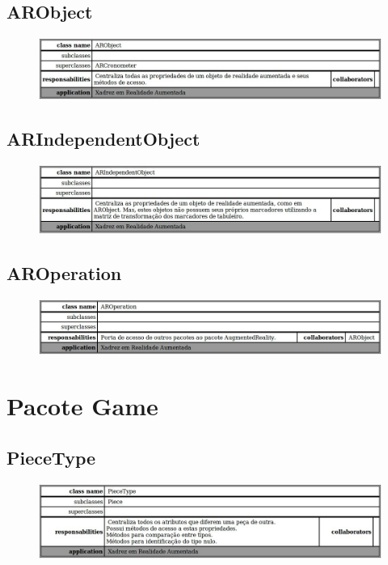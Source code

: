 \documentclass[a4paper,12pt]{book}
\begin{document}
    \subsection{ARObject}
    \label{subsec:crcarobject}
    \begin{figure}[H]
	  \centering
	  \includegraphics[width=1.0\textwidth]{crc/ARObject}
	  \end{figure}
    \subsection{ARIndependentObject}
    \label{subsec:crcarindependentobject}
    \begin{figure}[H]
	  \centering
	  \includegraphics[width=1.0\textwidth]{crc/ARIndependentObject}
	  \end{figure}
    \subsection{AROperation}
    \label{subsec:crcaroperation}
    \begin{figure}[H]
	  \centering
	  \includegraphics[width=1.0\textwidth]{crc/AROperation}
	  \end{figure}
  \section{Pacote Game}
  \label{sec:crcpacotegame}
    \subsection{PieceType}
    \label{subsec:crcpiecetype}
    \begin{figure}[H]
	  \centering
	  \includegraphics[width=1.0\textwidth]{crc/PieceType}
	  \end{figure}
\end{document}
